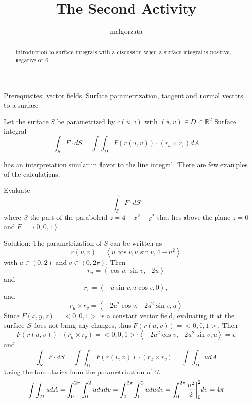 \documentclass{ximera}
\title{The Second Activity}
\author{malgorzata}
\begin{document}
\begin{abstract}
 Introduction to surface integrals with a discussion when a surface integral is positive, negative or $0$
\end{abstract}


\maketitle

Prerequisites: vector fields, Surface parametrization, tangent and normal vectors to a surface


Let the surface $S$ be parametrized by $r(u,v)$ with $(u,v)\in D\subset \mathbb {R}^2$
Surface integral
\[
\int_{S}F\cdot dS=\int\int_{D}F(r(u,v))\cdot (r_u\times r_v)dA
\]

has an interpretation similar in flavor to the line integral.
There are few examples of the calculations:

\begin{example}
Evaluate 
\[
\int_{S}F\cdot dS
\]
where $S$ the part of the paraboloid $z=4-x^2-y^2$ that lies above the plane $z=0$ and $F=\left<0,0,1\right>$

Solution: 
The parametrization of $S$ can be written as 
\[
r(u,v)=\left<u\cos v,u \sin v,4-u^2\right>
\]
with $u\in(0,2) $ and $v\in (0,2\pi)$. Then 
\[
r_u=\left<\cos v,\sin v,-2u\right>
\]
and 
\[
r_v=\left<-u \sin v,u\cos v,0\right>,
\]
and
\[
r_u\times r_v=\left<-2u^2\cos v ,-2u^2\sin v ,u \right>
\]
Since $F(x,y,z)=<0,0,1>$ is a constant vector field, evaluating it at the surface $S$ does not bring any changes, thus $F(r(u,v))=<0,0,1>$. Then
\[
F(r(u,v))\cdot (r_u\times r_v)=<0,0,1>\cdot \left<-2u^2\cos v ,-2u^2\sin v ,u \right>=u
\]
and 
\[
\int_{S}F\cdot dS=\int\int_{D}F(r(u,v))\cdot (r_u\times r_v)=\int\int_{D}udA
\]
Using the boundaries from the parametrization of $S$:
\[
\int\int_{D}udA=\int^{2 \pi}_{0}\int^{2}_{0}ududv=\int^{2\pi}_{0}\int^{2}_{0}ududv=\int^{2\pi}_{0}\frac{u^2}{2}\bigg{|}^{2}_{0}dv=4\pi
\]
\end{example}
\end{document}
